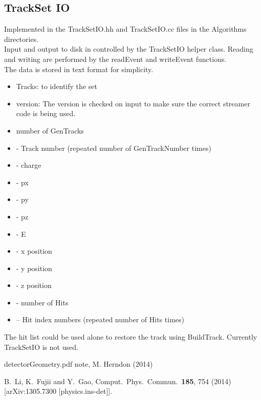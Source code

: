 \documentclass[aps,prd,superscriptaddress,floatfix]{revtex4}
\begin{document}
\subsection{TrackSet IO}
Implemented in the TrackSetIO.hh and TrackSetIO.cc files in the Algorithms directories.
\\

Input and output to disk in controlled by the TrackSetIO helper class.  Reading and writing
are performed by the readEvent and writeEvent functions.
\\

The data is stored in text format for simplicity.

\begin{itemize}
\item Tracks: to identify the set
\item version: The version is checked on input to make sure the correct streamer code is being used.
\item number of GenTracks
\item - Track number (repeated number of GenTrackNumber times)
\item - charge
\item - px
\item - py
\item - pz
\item - E
\item - x position
\item - y position
\item - z position
\item - number of Hits
\item -- Hit index numbers (repeated number of Hits times)
\end{itemize}

The hit list could be used alone to restore the track using BuildTrack.  Currently TrackSetIO is not used.

\begin{thebibliography}{99}

detectorGeometry.pdf note, M. Herndon (2014)

  B.~Li, K.~Fujii and Y.~Gao,
  Comput.\ Phys.\ Commun.\  {\bf 185}, 754 (2014)
  [arXiv:1305.7300 [physics.ins-det]].


\end{thebibliography}
% 
\end{document}
